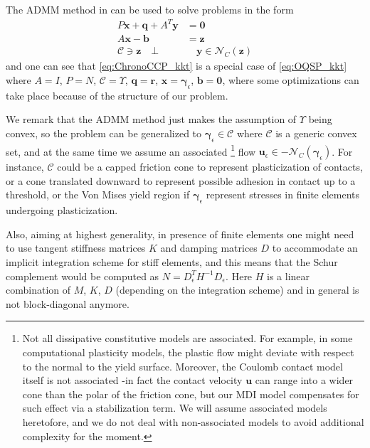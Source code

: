 \documentclass[AMA,STIX1COL]{WileyNJD-v2}
\newcommand{\vect}[1]{\bm{#1}}
\begin{document}
The ADMM method in \cite{Stellato2020} can be used to solve problems in the form
\begin{subequations}
	\begin{align}
    P \vect{x} + \vect{q} + A^T \vect{y} &= \vect{0} \\
    A \vect{x} - \vect{b} &= \vect{z} \\
    \mathcal{C} \ni \vect{z}  \quad \bot &\quad \vect{y} \in \mathcal{N}_{C}(\vect{z})
	\end{align}
	\label{eq:OQSP_kkt}
\end{subequations}
and one can see that \eqref{eq:ChronoCCP_kkt} is a special case of \eqref{eq:OQSP_kkt} where $A=I$, $P=N$, $\mathcal{C}=\Upsilon$, $\vect{q}=\vect{r}$, $\vect{x}=\vect{\gamma}_\epsilon$, $\vect{b}=\vect{0}$, where some optimizations can take place because of the structure of our problem.


We remark that the ADMM method just makes the assumption of $\Upsilon$ being convex, so the problem can be generalized to $\vect{\gamma}_\epsilon \in \mathcal{C}$ where $\mathcal{C}$ is a generic convex set, and at the same time we assume an associated 
 \footnote{Not all dissipative constitutive models are associated. For example, in some computational plasticity models, the plastic flow might deviate with respect to the normal to the yield surface. Moreover, the Coulomb contact model itself is not associated -in fact the contact velocity $\vect{u}$ can range into a wider cone than the polar of the friction cone, but our MDI model compensates for such effect via a stabilization term. We will assume associated models heretofore, and we do not deal with non-associated models to avoid additional complexity for the moment.} 
flow $\vect{u}_\epsilon \in - \mathcal{N}_{C}(\vect{\gamma}_\epsilon)$. For instance, $\mathcal{C}$ could be a capped friction cone to represent plasticization of contacts, or a cone translated downward to represent possible adhesion in contact up to a threshold, or the Von Mises yield region if $\vect{\gamma}_\epsilon$ represent stresses in finite elements undergoing plasticization. 

Also, aiming at highest generality, in presence of finite elements one might need to use tangent stiffness matrices $K$ and damping matrices $D$ to accommodate an implicit integration scheme for stiff elements, and this means that the Schur complement would be computed as $N=D_{\epsilon}^T H^{-1} D_{\epsilon}$. Here $H$ is a linear combination of $M$, $K$, $D$ (depending on the integration scheme) and in general is not block-diagonal anymore. 
\end{document}
